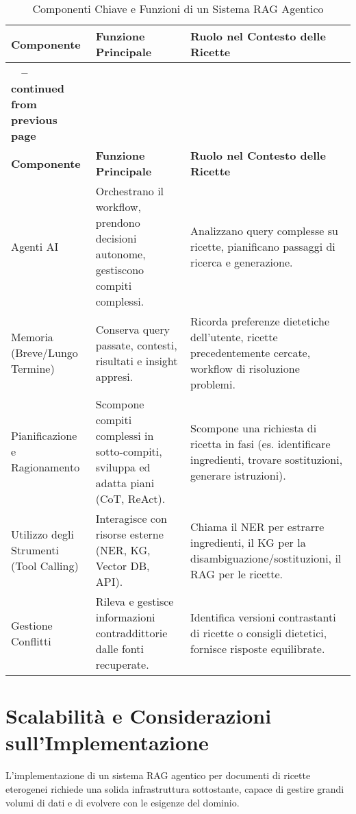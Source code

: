 \documentclass[a4paper, 11pt]{article}
\begin{document}
\begin{longtable}{>{\raggedright\arraybackslash}p{4cm} >{\raggedright\arraybackslash}p{6cm} >{\raggedright\arraybackslash}p{6cm}}
\caption{Componenti Chiave e Funzioni di un Sistema RAG Agentico}\\
\toprule
\textbf{Componente} & \textbf{Funzione Principale} & \textbf{Ruolo nel Contesto delle Ricette} \\
\midrule
\endfirsthead
\multicolumn{3}{c}%
{{\bfseries \tablename\ \thetable{} -- continued from previous page}} \\
\toprule
\textbf{Componente} & \textbf{Funzione Principale} & \textbf{Ruolo nel Contesto delle Ricette} \\
\midrule
\endhead
\bottomrule
\endfoot
Agenti AI \cite{what_is_agentic_rag_ibm} & Orchestrano il workflow, prendono decisioni autonome, gestiscono compiti complessi. & Analizzano query complesse su ricette, pianificano passaggi di ricerca e generazione. \\
\addlinespace
Memoria (Breve/Lungo Termine) \cite{what_is_agentic_rag_ibm} & Conserva query passate, contesti, risultati e insight appresi. & Ricorda preferenze dietetiche dell'utente, ricette precedentemente cercate, workflow di risoluzione problemi. \\
\addlinespace
Pianificazione e Ragionamento \cite{what_is_agentic_rag_ibm} & Scompone compiti complessi in sotto-compiti, sviluppa ed adatta piani (CoT, ReAct). & Scompone una richiesta di ricetta in fasi (es. identificare ingredienti, trovare sostituzioni, generare istruzioni). \\
\addlinespace
Utilizzo degli Strumenti (Tool Calling) \cite{what_is_agentic_rag_ibm} & Interagisce con risorse esterne (NER, KG, Vector DB, API). & Chiama il NER per estrarre ingredienti, il KG per la disambiguazione/sostituzioni, il RAG per le ricette. \\
\addlinespace
Gestione Conflitti \cite{dragged_into_conflicts} & Rileva e gestisce informazioni contraddittorie dalle fonti recuperate. & Identifica versioni contrastanti di ricette o consigli dietetici, fornisce risposte equilibrate. \\
\end{longtable}

\section{Scalabilità e Considerazioni sull'Implementazione}
L'implementazione di un sistema RAG agentico per documenti di ricette eterogenei richiede una solida infrastruttura sottostante, capace di gestire grandi volumi di dati e di evolvere con le esigenze del dominio.
\end{document}
